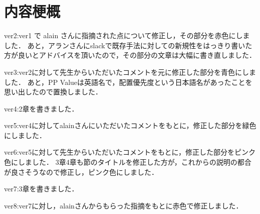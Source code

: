 \chapter*{内容梗概}
ver2:ver1 で alain さんに指摘された点について修正し，その部分を赤色にしました．
あと，アランさんにslackで既存手法に対しての新規性をはっきり書いた方が良いとアドバイスを頂いたので，その部分の文章は大幅に書き直しました．

ver3:ver2に対して先生からいただいたコメントを元に修正した部分を青色にしました．
あと，PP Valueは英語名で，配置優先度という日本語名があったことを思い出したので置換しました．

ver4:2章を書きました．

ver5:ver4に対してalainさんにいただいたコメントをもとに，修正した部分を緑色にしました．

ver6:ver5に対して先生からいただいたコメントをもとに，修正した部分をピンク色にしました．
    3章4章も節のタイトルを修正した方が，これからの説明の都合が良さそうなので修正し，ピンク色にしました．

ver7:3章を書きました．

ver8:ver7に対し，alainさんからもらった指摘をもとに赤色で修正しました．
